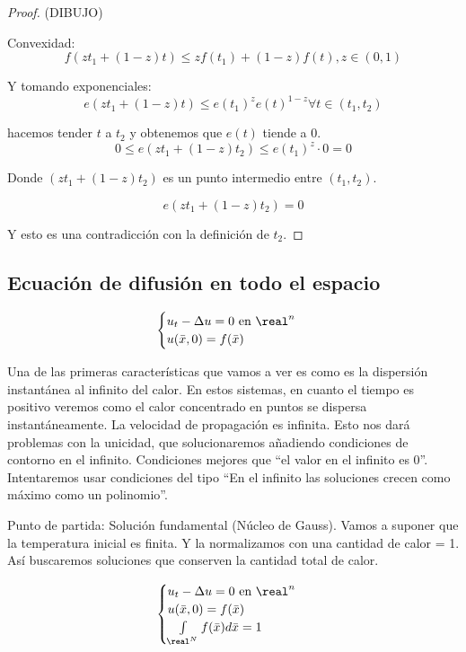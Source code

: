 \begin{proof}
			(DIBUJO)

			Convexidad:
			\[f(zt_1 + (1-z)t) \leq zf(t_1) + (1-z) f(t), z \in (0,1)\]

			Y tomando exponenciales:
			\[e(zt_1 + (1-z)t) \leq e(t_1)^z e(t)^{1-z} \forall t \in (t_1,t_2)\]

			hacemos tender $t$ a $t_2$ y obtenemos que $e(t)$ tiende a 0.
			\[ 0 \leq e(zt_1 + (1-z)t_2) \leq e(t_1)^z \cdot 0 = 0\]

			Donde $(zt_1 + (1-z)t_2)$ es un punto intermedio entre $(t_1,t_2)$.

			\[e(zt_1+(1-z)t_2) = 0\]

			Y esto es una contradicción con la definición de $t_2$.

		\end{proof}

	\subsection{Ecuación de difusión en todo el espacio}

		\[\begin{cases}
			u_t - \Delta u = 0 \text{ en } \real^n\\
			u(\bar{x},0) = f(\bar{x})
		\end{cases}\]

		Una de las primeras características que vamos a ver es como es la dispersión instantánea al infinito del calor. En estos sistemas, en cuanto el tiempo es positivo veremos como el calor concentrado en puntos se dispersa instantáneamente. La velocidad de propagación es infinita. Esto nos dará problemas con la unicidad, que solucionaremos añadiendo condiciones de contorno en el infinito. Condiciones mejores que ``el valor en el infinito es 0''. Intentaremos usar condiciones del tipo ``En el infinito las soluciones crecen como máximo como un polinomio''.

		Punto de partida: Solución fundamental (Núcleo de Gauss). Vamos a suponer que la temperatura inicial es finita. Y la normalizamos con una cantidad de calor = 1. Así buscaremos soluciones que conserven la cantidad total de calor.

		\[\begin{cases}
			u_t - \Delta u = 0 \text{ en } \real^n\\
			u(\bar{x},0) = f(\bar{x}) \\
			\int\limits_{\real^N} f(\bar{x}) d\bar{x} = 1
		\end{cases}\]

